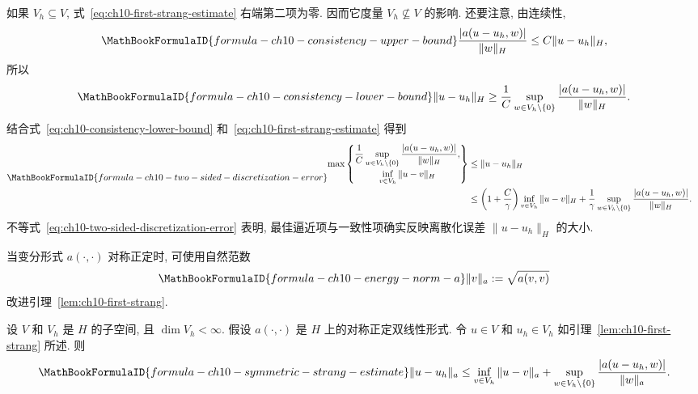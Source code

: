 如果 $V_h\subseteq V$, 式~\eqref{eq:ch10-first-strang-estimate} 右端第二项为零. 因而它度量 $V_h\not\subseteq V$ 的影响. 还要注意, 由连续性,
\begin{equation}
\MathBookFormulaID{formula-ch10-consistency-upper-bound}
\label{eq:ch10-consistency-upper-bound}
\frac{|a(u-u_h,w)|}{\|w\|_H}\leq C\|u-u_h\|_H,
\end{equation}
所以
\begin{equation}
\MathBookFormulaID{formula-ch10-consistency-lower-bound}
\label{eq:ch10-consistency-lower-bound}
\|u-u_h\|_H\geq\frac1C\sup_{w\in V_h\setminus\{0\}}
\frac{|a(u-u_h,w)|}{\|w\|_H}.
\end{equation}
结合式~\eqref{eq:ch10-consistency-lower-bound} 和~\eqref{eq:ch10-first-strang-estimate} 得到
\begin{equation}
\MathBookFormulaID{formula-ch10-two-sided-discretization-error}
\label{eq:ch10-two-sided-discretization-error}
\begin{split}
\max\left\{\begin{gathered}
\displaystyle\frac1C\sup_{w\in V_h\setminus\{0\}}
\frac{|a(u-u_h,w)|}{\|w\|_H},\\[-2pt]
\displaystyle\inf_{v\in V_h}\|u-v\|_H
\end{gathered}\right\}
&\leq\|u-u_h\|_H\\
&\leq\left(1+\frac C\gamma\right)\inf_{v\in V_h}\|u-v\|_H
+\frac1\gamma\sup_{w\in V_h\setminus\{0\}}
\frac{|a(u-u_h,w)|}{\|w\|_H}.
\end{split}
\end{equation}
不等式~\eqref{eq:ch10-two-sided-discretization-error} 表明, 最佳逼近项与一致性项确实反映离散化误差 $\|u-u_h\|_H$ 的大小.

当变分形式 $a(\cdot,\cdot)$ 对称正定时, 可使用自然范数
\[
\MathBookFormulaID{formula-ch10-energy-norm-a}
\|v\|_a:=\sqrt{a(v,v)}
\]
改进引理~\ref{lem:ch10-first-strang}.

\begin{Lemma}
\label{lem:ch10-symmetric-strang}
设 $V$ 和 $V_h$ 是 $H$ 的子空间, 且 $\dim V_h<\infty$. 假设 $a(\cdot,\cdot)$ 是 $H$ 上的对称正定双线性形式. 令 $u\in V$ 和 $u_h\in V_h$ 如引理~\ref{lem:ch10-first-strang} 所述. 则
\begin{equation}
\MathBookFormulaID{formula-ch10-symmetric-strang-estimate}
\label{eq:ch10-symmetric-strang-estimate}
\|u-u_h\|_a\leq\inf_{v\in V_h}\|u-v\|_a
+\sup_{w\in V_h\setminus\{0\}}\frac{|a(u-u_h,w)|}{\|w\|_a}.
\end{equation}
\end{Lemma}

